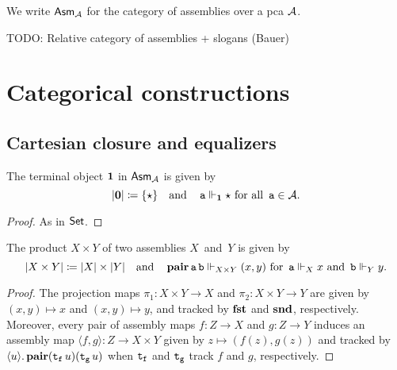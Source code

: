\begin{notation}[\(\Asm{\AA}\)]
  We write \(\Asm{\AA}\) for the category of assemblies over a pca \(\AA\).
\end{notation}

\begin{remark}
  \textcolor{Mulberry}{TODO: Relative category of assemblies + slogans (Bauer)}
\end{remark}

\section{Categorical constructions}

\subsection{Cartesian closure and equalizers}
\begin{proposition}
  The terminal object \(\One\) in \(\Asm{\AA}\) is given by
  \[
    \carrier{\Zero} \coloneq \set{\singleton}
    \quad
    \text{and}
    \quad
    \pca{a} \realizes_\One \singleton
    \text{ for all } \pca{a} \in \AA.
  \]
\end{proposition}
\begin{proof}
  As in \(\Set\).
\end{proof}


\begin{proposition}[Products]
  The product \(X \times Y\) of two assemblies \(X\)~and~\(Y\) is given by
  \[
    \carrier{X \times Y} \coloneq \carrier{X} \times \carrier{Y}
    \quad\text{and}\quad
    \pcapair\pca{a}\pca{b} \realizes_{X \times Y} (x,y)
    \text{ for }
    \pca{a} \realizes_X x
    \text{ and }
    \pca{b} \realizes_Y y.
  \]
\end{proposition}
\begin{proof}
  The projection maps \(\pi_1 \colon X \times Y \to X\) and
  \(\pi_2 \colon X \times Y \to Y\) are given by \((x,y) \mapsto x\) and
  \((x,y) \mapsto y\), and tracked by \(\pcafst\) and \(\pcasnd\), respectively.
  Moreover, every pair of assembly maps \(f \colon Z \to X\) and
  \(g \colon Z \to Y\) induces an assembly map
  \(\langle f,g\rangle \colon Z \to X \times Y\) given by
  \(z \mapsto (f(z),g(z))\) and tracked by
  \(\lambdapca{u}{\pcapair(\pca{t_f}u)(\pca{t_g}u)}\) when \(\pca{t_f}\) and
  \(\pca{t_g}\) track \(f\) and \(g\), respectively.
\end{proof}

